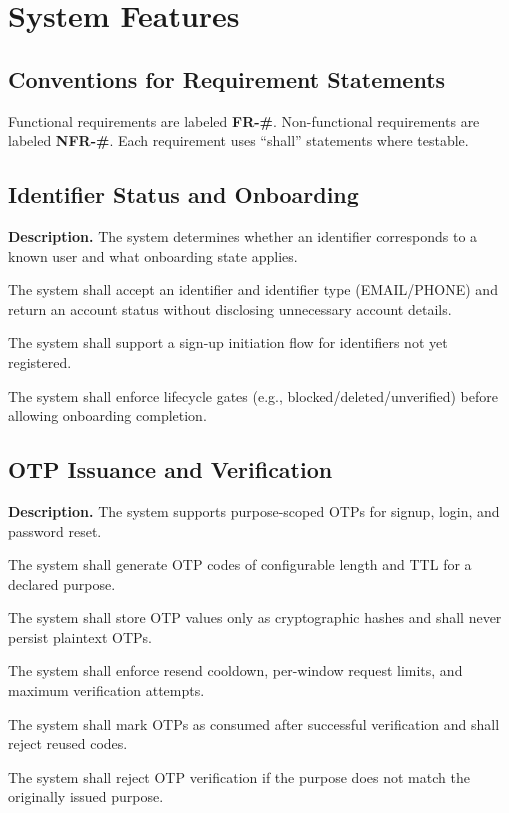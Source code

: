 \documentclass[11pt]{article}
\begin{document}


    \section{System Features}\label{sec:features}

    \subsection{Conventions for Requirement Statements}
    Functional requirements are labeled \textbf{FR-\#}. Non-functional requirements are labeled \textbf{NFR-\#}. Each requirement uses ``shall'' statements where testable.

    \subsection{Identifier Status and Onboarding}
    \textbf{Description.} The system determines whether an identifier corresponds to a known user and what onboarding state applies.

    \begin{description}[leftmargin=0pt,labelwidth=3.2cm]
  \item[FR-1] The system shall accept an identifier and identifier type (EMAIL/PHONE) and return an account status without disclosing unnecessary account details.
  \item[FR-2] The system shall support a sign-up initiation flow for identifiers not yet registered.
  \item[FR-3] The system shall enforce lifecycle gates (e.g., blocked/deleted/unverified) before allowing onboarding completion.
    \end{description}

    \subsection{OTP Issuance and Verification}
    \textbf{Description.} The system supports purpose-scoped OTPs for signup, login, and password reset.

    \begin{description}[leftmargin=0pt,labelwidth=3.2cm]
  \item[FR-4] The system shall generate OTP codes of configurable length and TTL for a declared purpose.
  \item[FR-5] The system shall store OTP values only as cryptographic hashes and shall never persist plaintext OTPs.
  \item[FR-6] The system shall enforce resend cooldown, per-window request limits, and maximum verification attempts.
  \item[FR-7] The system shall mark OTPs as consumed after successful verification and shall reject reused codes.
  \item[FR-8] The system shall reject OTP verification if the purpose does not match the originally issued purpose.
    \end{description}
\end{document}
